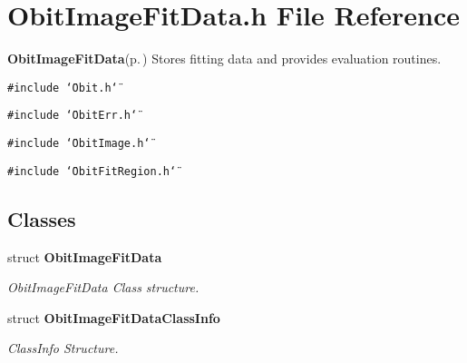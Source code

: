 \section{Obit\-Image\-Fit\-Data.h File Reference}
\label{ObitImageFitData_8h}
{\bf Obit\-Image\-Fit\-Data}{\rm (p.\,\pageref{structObitImageFitData})} Stores fitting data and provides evaluation routines. 

{\tt \#include \char`\"{}Obit.h\char`\"{}}\par
{\tt \#include \char`\"{}Obit\-Err.h\char`\"{}}\par
{\tt \#include \char`\"{}Obit\-Image.h\char`\"{}}\par
{\tt \#include \char`\"{}Obit\-Fit\-Region.h\char`\"{}}\par
\subsection*{Classes}
\begin{CompactItemize}
\item 
struct {\bf Obit\-Image\-Fit\-Data}
\begin{CompactList}\small\item\em Obit\-Image\-Fit\-Data Class structure. \item\end{CompactList}\item 
struct {\bf Obit\-Image\-Fit\-Data\-Class\-Info}
\begin{CompactList}\small\item\em Class\-Info Structure. \item\end{CompactList}\end{CompactItemize}
